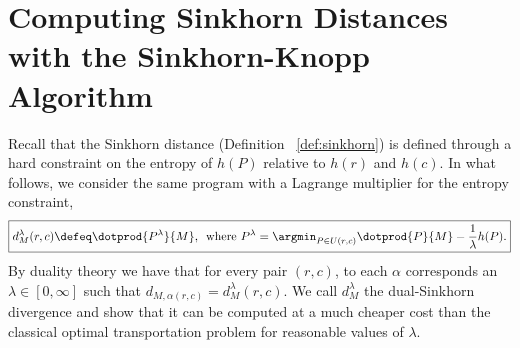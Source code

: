 \documentclass{amsart} %
\begin{document}
\section{Computing Sinkhorn Distances with the Sinkhorn-Knopp Algorithm}\label{sec:computing}
Recall that the Sinkhorn distance (Definition ~\ref{def:sinkhorn}) is  defined through a hard constraint on the entropy of $h(P)$ relative to $h(r)$ and $h(c)$.
In what follows, we consider the same program with a Lagrange multiplier for the entropy constraint,
\begin{equation}\label{eq:pen}
\boxed{d_{M}^{\lambda}(r,c) \defeq \dotprod{P^\lambda}{M},\,\text{ where } P^\lambda=\argmin_{P\in U(r,c)} \dotprod{P}{M} - \frac{1}{\lambda} h(P).}
\end{equation}
By duality theory we have that for every pair $(r,c)$, to each $\alpha$ corresponds an $\lambda\in[0,\infty]$ such that $d_{M,\alpha(r,c)}=d_{M}^{\lambda}(r,c)$. We call $d_{M}^\lambda$ the dual-Sinkhorn divergence and show that it can be computed at a much cheaper cost than the classical optimal transportation problem for reasonable values of $\lambda$. 
\end{document}
